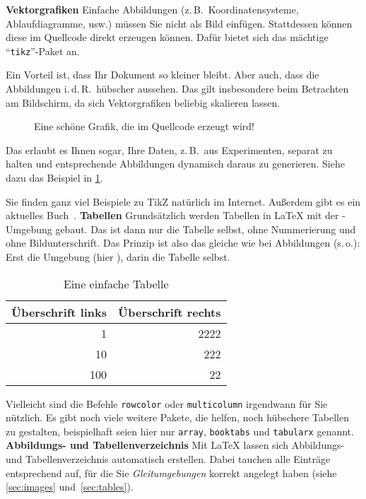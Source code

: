 %
%
\textbf{Vektorgrafiken}
\label{sec:vectorGraphcis}
%
Einfache Abbildungen (z.\,B.\ Koordinatensysteme, Ablaufdiagramme, usw.) müssen Sie nicht als Bild einfügen. Stattdessen können diese im Quellcode direkt erzeugen können. Dafür bietet sich das mächtige \enquote{\texttt{tikz}}-Paket an.
\par
Ein Vorteil ist, dass Ihr Dokument so kleiner bleibt. Aber auch, dass die Abbildungen i.\,d.\,R.\ hübscher aussehen. Das gilt insbesondere beim Betrachten am Bildschirm, da sich Vektorgrafiken beliebig skalieren lassen.
%
\begin{figure}[tbh]
\centering

\caption{Eine schöne Grafik, die im Quellcode erzeugt wird!}
\label{fig:plotFleuret}
\end{figure}
%
Das erlaubt es Ihnen sogar, Ihre Daten, z.\,B.\ aus Experimenten, separat zu halten und entsprechende Abbildungen dynamisch daraus zu generieren. Siehe dazu das Beispiel in \cref{fig:plotFleuret}.
\par
Sie finden ganz viel Beispiele zu TikZ natürlich im Internet. Außerdem gibt es ein aktuelles Buch~\cite{kottwitz:tikz}.
%
%
\textbf{Tabellen}
\label{sec:tables}
Grundsätzlich werden Tabellen in \LaTeX{} mit der -Umgebung gebaut. Das ist dann nur die Tabelle selbst, ohne Nummerierung und ohne Bildunterschrift. Das Prinzip ist also das gleiche wie bei Abbildungen (s.\,o.): Erst die Umgebung (hier ), darin die Tabelle selbst.
%
\begin{table}[tbh]
 \centering
 \begin{tabular}{r|r}
 Überschrift links & Überschrift rechts\\
 \hline
 1   & 2222\\
 10  & 222\\
 100 & 22
 \end{tabular}
 \caption{Eine einfache Tabelle}
 \label{tab:example}
\end{table}
%
Vielleicht sind die Befehle \texttt{rowcolor} oder \texttt{multicolumn} irgendwann für Sie nützlich. Es gibt noch viele weitere Pakete, die helfen, noch hübschere Tabellen zu gestalten, beispielhaft seien hier nur \texttt{array}, \texttt{booktabs} und \texttt{tabularx} genannt.
%
%
\textbf{Abbildungs- und Tabellenverzeichnis}
\label{sec:captions}
Mit \LaTeX{} lassen sich Abbildungs- und Tabellenverzeichnis automatisch erstellen. Dabei tauchen alle Einträge entsprechend auf, für die Sie \emph{Gleitumgebungen} korrekt angelegt haben (siehe \cref{sec:images} und~\ref{sec:tables}).
\par
